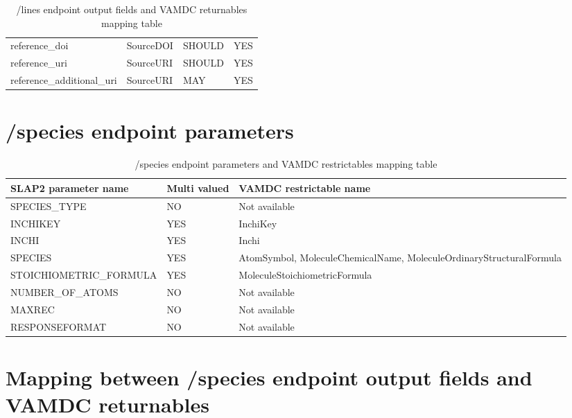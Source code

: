 \documentclass[11pt,a4paper]{ivoa}
\begin{document}
\begin{table}[H]
\begin{tabularx}{\textwidth}{|p{4cm}|>{\raggedright\arraybackslash}X|p{2.3cm}|p{1.5cm}|}
reference\_doi                         & SourceDOI                                                     & SHOULD  &  YES  \\
reference\_uri                         & SourceURI                                                     & SHOULD  &  YES  \\
reference\_additional\_uri             & SourceURI                                                     & MAY     &  YES  \\
\hline
\end{tabularx}
\caption{/lines endpoint output fields and VAMDC returnables mapping table}
\end{table}

\section{/species endpoint parameters}

\begin{table}[H]
\centering
\footnotesize
\begin{tabularx}{\textwidth}{|p{5.8cm}|p{1.5cm}|>{\raggedright\arraybackslash}X|}
\hline
\headerstrut\textbf{SLAP2 parameter name} & \textbf{Multi valued} & \textbf{VAMDC restrictable name}\\
\hline
SPECIES\_TYPE                         & NO      & Not available       \\
INCHIKEY                              & YES     & InchiKey            \\
INCHI                                 & YES     & Inchi               \\
SPECIES                               & YES     & AtomSymbol, Molecule\-Chemical\-Name, Molecule\-Ordinary\-Structural\-Formula \\
STOICHIOMETRIC\_FORMULA               & YES     & Molecule\-Stoichio\-metric\-Formula \\
NUMBER\_OF\_ATOMS                     & NO      & Not available        \\
MAXREC                                & NO      & Not available        \\
RESPONSEFORMAT                        & NO      & Not available        \\
\hline
\end{tabularx}
\caption{ /species endpoint parameters and VAMDC restrictables mapping table }
\end{table}



\section{Mapping between /species endpoint output fields and VAMDC returnables}
\end{document}
